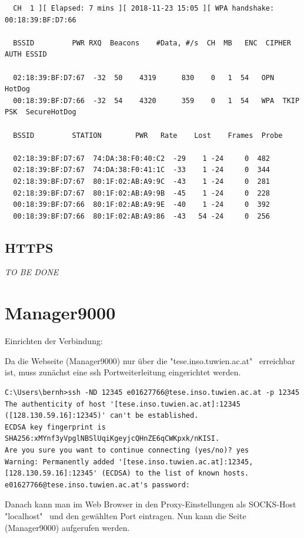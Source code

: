 \documentclass[12pt,a4paper,titlepage,oneside]{scrartcl}
\begin{document}
\begin{lstlisting}
  CH  1 ][ Elapsed: 7 mins ][ 2018-11-23 15:05 ][ WPA handshake: 00:18:39:BF:D7:66

  BSSID		    PWR RXQ  Beacons	#Data, #/s  CH	MB   ENC  CIPHER AUTH ESSID
 
  02:18:39:BF:D7:67  -32  50	4319	  830	 0   1	54   OPN	      HotDog
  00:18:39:BF:D7:66  -32  54	4320	  359	 0   1	54   WPA  TKIP	 PSK  SecureHotDog
 
  BSSID		    STATION	       PWR   Rate    Lost    Frames  Probe
 
  02:18:39:BF:D7:67  74:DA:38:F0:40:C2  -29    1 -24	 0	482
  02:18:39:BF:D7:67  74:DA:38:F0:41:1C  -33    1 -24	 0	344
  02:18:39:BF:D7:67  80:1F:02:AB:A9:9C  -43    1 -24	 0	281
  02:18:39:BF:D7:67  80:1F:02:AB:A9:9B  -45    1 -24	 0	228
  00:18:39:BF:D7:66  80:1F:02:AB:A9:9E  -40    1 -24	 0	392
  00:18:39:BF:D7:66  80:1F:02:AB:A9:86  -43   54 -24	 0	256
\end{lstlisting}

\subsection{HTTPS}
\emph{TO BE DONE}

\section{Manager9000}

Einrichten der Verbindung:

Da die Webseite (Manager9000) nur über die "tese.inso.tuwien.ac.at" \ erreichbar ist, muss zunächst eine ssh Portweiterleitung eingerichtet werden.

\begin{lstlisting}
C:\Users\bernh>ssh -ND 12345 e01627766@tese.inso.tuwien.ac.at -p 12345
The authenticity of host '[tese.inso.tuwien.ac.at]:12345 ([128.130.59.16]:12345)' can't be established.
ECDSA key fingerprint is SHA256:xMYnf3yVpglNBSlUqiKgeyjcQHnZE6qCWKpxk/nKISI.
Are you sure you want to continue connecting (yes/no)? yes
Warning: Permanently added '[tese.inso.tuwien.ac.at]:12345,[128.130.59.16]:12345' (ECDSA) to the list of known hosts.
e01627766@tese.inso.tuwien.ac.at's password:
\end{lstlisting}

Danach kann man im Web Browser in den Proxy-Einstellungen als SOCKS-Host "localhost" \ und den gewählten Port eintragen. Nun kann die Seite (Manager9000) aufgerufen werden.
\end{document}
